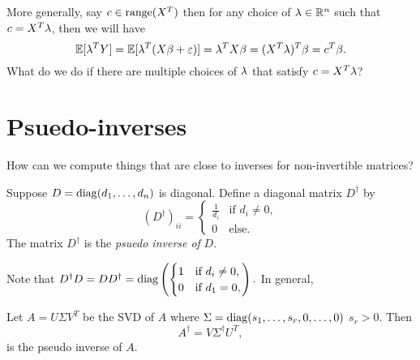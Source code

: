 More generally, say $c \in \operatorname{range}(X^T)$ then for any choice of $\lambda \in {\mathbb R}^n$ such that $c = X^T\lambda$, then we will have 
\[{\mathbb{E}}[\lambda^T Y] = {\mathbb{E}}[\lambda^T(X \beta+\varepsilon)] = \lambda^T X\beta = (X^T \lambda)^T\beta = c^T\beta. \]
What do we do if there are multiple choices of $\lambda$ that satisfy $c = X^T \lambda$?
\section{Psuedo-inverses}
How can we compute things that are close to inverses for non-invertible matrices?
\begin{defn}
    Suppose $D = \operatorname*{diag}(d_1,\ldots, d_n)$ is diagonal. Define a diagonal matrix $D^\dagger$ by
    \[(D^\dagger)_{ii} = \begin{cases}
        \frac{1}{d_i} & \text{if } d_i \neq 0,\\
        0 & \text{else.}
    \end{cases} \]
    The matrix $D^\dagger$ is the \emph{psuedo inverse of } $D$.
\end{defn}
Note that $D^\dagger D = DD^\dagger = \operatorname*{diag}\left(\begin{cases}
    1 & \text{if } d_i \neq 0,\\ 0 & \text{if } d_1 = 0,
\end{cases}\right).$ In general,
\begin{defn}
    Let $A = U\Sigma V^T$ be the SVD of $A$ where $\Sigma = \operatorname*{diag}(s_1,\ldots, s_r, 0, \ldots, 0)$ $s_r > 0$. Then 
    \[A^\dagger = V\Sigma^\dagger U^T,  \]
    is the pseudo inverse of $A$.
\end{defn}
